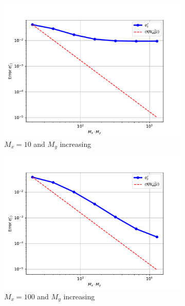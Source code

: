 \begin{figure}[t]
\begin{subfigure}{.5\textwidth}
  \centering
  \includegraphics[width=\linewidth]{plots/task3bMx20.pdf}
  \caption{$M_x = 10$ and $M_y$ increasing}
\end{subfigure}
\begin{subfigure}{.5\textwidth}
  \centering
  \includegraphics[width=\linewidth]{plots/task3bMx50.pdf}
  \caption{$M_x = 100$ and $M_y$ increasing}
\end{subfigure}
\begin{subfigure}{.5\textwidth}
  \centering

\end{subfigure}
\end{figure}
